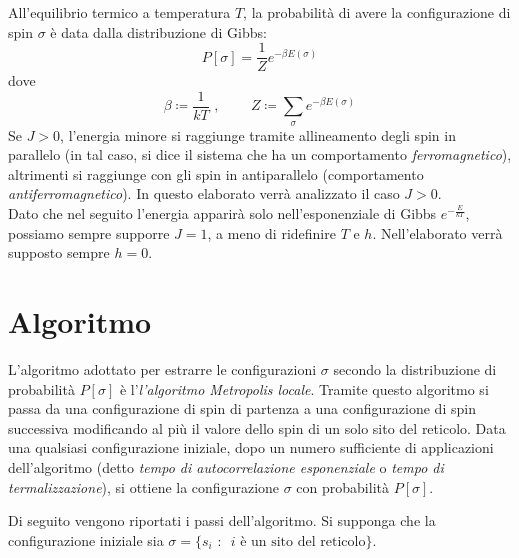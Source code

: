 \documentclass[10pt,a4paper]{article}
\begin{document}
All'equilibrio termico a temperatura $T$, la probabilità di avere la configurazione di spin $\sigma$ è data dalla distribuzione di Gibbs:
\begin{equation}
	P[\sigma]=\frac{1}{Z}e^{-\beta E(\sigma)}
	\label{eq:distribuzioneGibbs}
\end{equation}
dove 
$$\beta \coloneqq \frac{1}{kT}\text{ , }\qquad Z\coloneqq\sum_{\sigma}e^{-\beta E(\sigma)}$$
Se $J>0$, l'energia minore si raggiunge tramite allineamento degli spin in parallelo (in tal caso, si dice il sistema che ha un comportamento \emph{ferromagnetico}), altrimenti si raggiunge con gli spin in antiparallelo (comportamento \emph{antiferromagnetico}). In questo elaborato verrà analizzato il caso $J>0$. \\ 
Dato che nel seguito l'energia apparirà solo nell'esponenziale di Gibbs $e^{-\frac{E}{kT}}$,  possiamo sempre supporre $J=1$, a meno di ridefinire $T$ e $h$. Nell'elaborato verrà supposto sempre $h=0$. 
\section{Algoritmo}
L'algoritmo adottato per estrarre le configurazioni $\sigma$ secondo la distribuzione di probabilità $P[\sigma]$ è l'\emph{l'algoritmo Metropolis locale}. Tramite questo algoritmo si passa da una configurazione di spin di partenza a una configurazione di spin successiva modificando al più il valore dello spin di un solo sito del reticolo. Data una qualsiasi configurazione iniziale, dopo un numero sufficiente di applicazioni dell'algoritmo (detto \emph{tempo di autocorrelazione esponenziale} o \emph{tempo di termalizzazione}), si ottiene la configurazione $\sigma$ con probabilità $P[\sigma]$.

Di seguito vengono riportati i passi dell'algoritmo. Si supponga che la configurazione iniziale sia $\sigma=\{ s_i\text{ :}\text{ } i  \text{ è un sito del reticolo} \}$.
\end{document}
